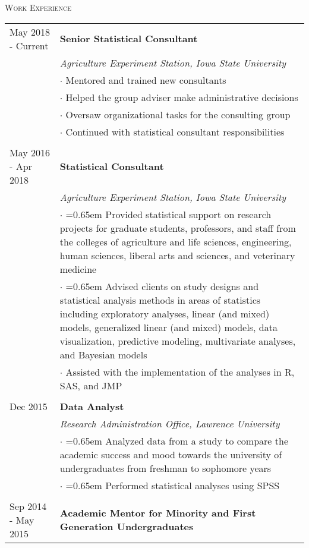 \documentclass[10pt, oneside]{article}
\begin{document}
\noindent \textsc{Work Experience} \hrulefill
\begin{longtable}{p{3.5cm}p{13cm}}
\hfill{May 2018 - Current} & \textbf{Senior Statistical Consultant}\\
& \emph{Agriculture Experiment Station, Iowa State University} \vspace{0.1cm}\\
& $\cdot$ Mentored and trained new consultants\\
& $\cdot$ Helped the group adviser make administrative decisions\\
& $\cdot$ Oversaw organizational tasks for the consulting group\\
& $\cdot$ Continued with statistical consultant responsibilities\\
\\
\hfill{May 2016 - Apr 2018} & \textbf{Statistical Consultant}\\
& \emph{Agriculture Experiment Station, Iowa State University} \vspace{0.1cm}\\
& $\cdot$ \hangindent=0.65em \hangafter=1 Provided statistical support on research projects for graduate students, professors, and staff from the colleges of agriculture and life sciences, engineering, human sciences, liberal arts and sciences, and veterinary medicine\\
& $\cdot$ \hangindent=0.65em \hangafter=1 Advised clients on study designs and statistical analysis methods in areas of statistics including exploratory analyses, linear (and mixed) models, generalized linear (and mixed) models, data visualization, predictive modeling, multivariate analyses, and Bayesian models\\
& $\cdot$ Assisted with the implementation of the analyses in R, SAS, and JMP\\
\\
\hfill{Dec 2015} & \textbf{Data Analyst}\\
& \emph{Research Administration Office, Lawrence University} \vspace{0.1cm}\\
& $\cdot$ \hangindent=0.65em \hangafter=1 Analyzed data from a study to compare the academic success and mood towards the university of undergraduates from freshman to sophomore years\\
& $\cdot$ \hangindent=0.65em \hangafter=1 Performed statistical analyses using SPSS\\
\\
\hfill{Sep 2014 - May 2015} & \textbf{Academic Mentor for Minority and First Generation Undergraduates}\\

\end{longtable}
\end{document}
